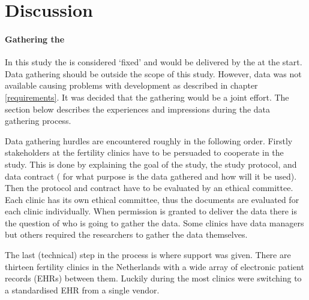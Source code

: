 \section{Discussion}

\paragraph{Gathering the \projectdata{}}

In this study the \projectdata{} is considered `fixed' and would be delivered by the \project{} at the start.
Data gathering should be outside the scope of this study.
However, data was not available causing problems with development as described in chapter \ref{requirements}.
It was decided that the gathering would be a joint effort.
The section below describes the experiences and impressions during the data gathering process.

Data gathering hurdles are encountered roughly in the following order.
Firstly stakeholders at the fertility clinics have to be persuaded to cooperate in the study.
This is done by explaining the goal of the study, the study protocol, and data contract (\ie{} for what purpose is the data gathered and how will it be used).
Then the protocol and contract have to be evaluated by an ethical committee.
Each clinic has its own ethical committee, thus the documents are evaluated for each clinic individually.
When permission is granted to deliver the data there is the question of who is going to gather the data.
Some clinics have data managers but others required the \project{} researchers to gather the data themselves.

The last (technical) step in the process is where support was given.
There are thirteen fertility clinics in the Netherlands with a wide array of electronic patient records (EHRs) between them.
Luckily during the \project{} most clinics were switching to a standardised EHR from a single vendor.

